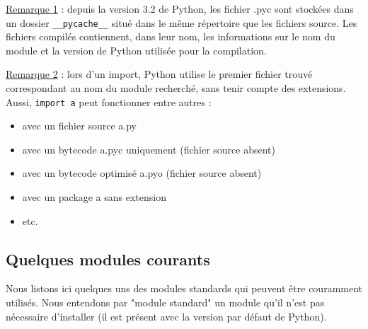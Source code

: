 \documentclass[12pt, a4paper]{article}
\begin{document}
\underline{Remarque 1} : depuis la version 3.2 de Python, les fichier .pyc sont stockées dans un dossier \lstinline{__pycache__} situé dans le même répertoire que les fichiers source. Les fichiers compilés contiennent, dans leur nom, les informations sur le nom du module et la version de Python utilisée pour la compilation.

\underline{Remarque 2} : lors d'un import, Python utilise le premier fichier trouvé correspondant au nom du module recherché, sans tenir compte des extensions. Aussi, \lstinline{import a} peut fonctionner entre autres :
\begin{itemize}
	\item avec un fichier source a.py
	\item avec un bytecode a.pyc uniquement (fichier source absent)
	\item avec un bytecode optimisé a.pyo (fichier source absent)
	\item avec un package a sans extension
	\item etc.
\end{itemize}


\subsection{Quelques modules courants}
Nous listons ici quelques uns des modules standards qui peuvent être couramment utilisés. Nous entendons par "module standard" un module qu'il n'est pas nécessaire d'installer (il est présent avec la version par défaut de Python).
\end{document}
